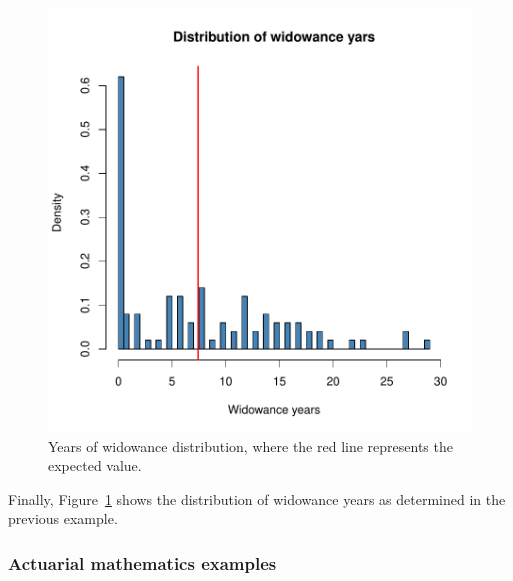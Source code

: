 \documentclass[nojss]{jss}
\begin{document}
\begin{figure}
\begin{center}
\includegraphics{an_introduction_to_lifecontingencies_package-widowanceFig}
\caption{Years of widowance distribution, where the red line represents the expected
value.}
\label{fig:widowanceFig}
\end{center}
\end{figure}

\clearpage

Finally, Figure~\ref{fig:widowanceFig} shows the distribution of widowance years 
as determined in the previous example.





\subsubsection{Actuarial mathematics examples}\label{sss:actmath}
\end{document}
